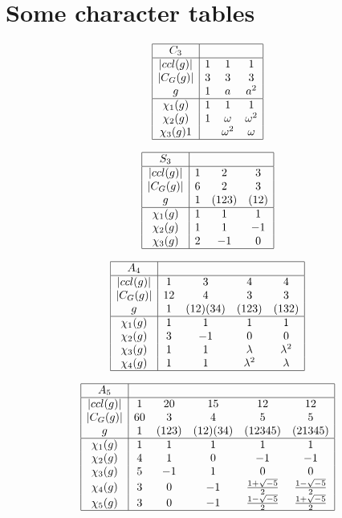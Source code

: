 {\section {Some character tables}

$$
\begin{array}{|c|ccc|}
\hline
C_3&&&\\
\hline
|ccl(g)|&1&1&1\\
|C_G(g)|&3&3&3\\
g&1&a&a^2\\
\hline
\chi_1(g)&1&1&1\\
\chi_2(g)&1&\omega&\omega^2\\
\chi_3(g)1&&\omega^2&\omega\\
\hline
\end{array}
$$

$$
\begin{array}{|c|ccc|}
\hline
S_3&&&\\
\hline
|ccl(g)|&1&2&3\\
|C_G(g)|&6&2&3\\
g&1&(123)&(12)\\
\hline
\chi_1(g)&1&1&1\\
\chi_2(g)&1&1&-1\\
\chi_3(g)&2&-1&0\\
\hline
\end{array}
$$

$$
\begin{array}{|c|cccc|}
\hline
A_4&&&&\\
\hline
|ccl(g)|&1&3&4&4\\
|C_G(g)|&12&4&3&3\\
g&1&(12)(34)&(123)&(132)\\
\hline
\chi_1(g)&1&1&1&1\\
\chi_2(g)&3&-1&0&0\\
\chi_3(g)&1&1&\lambda&\lambda^2 \\
\chi_4(g)&1&1&\lambda^2&\lambda \\
\hline
\end{array}
$$

$$
\begin{array}{|c|ccccc|}
\hline
A_5&&&&&\\
\hline
|ccl(g)|&1&20&15&12&12\\
|C_G(g)|&60&3&4&5&5\\
g&1&(123)&(12)(34)&(12345)&(21345)\\
\hline
\chi_1(g)&1&1&1&1&1\\
\chi_2(g)&4&1&0&-1&-1\\
\chi_3(g)&5&-1&1&0&0\\
\chi_4(g)&3&0&-1&{\frac {1 + \sqrt{-5}} {2}}&{\frac {1 - \sqrt{-5}} {2}}\\
\chi_5(g)&3&0&-1&{\frac {1 - \sqrt{-5}} {2}}&{\frac {1 + \sqrt{-5}} {2}}\\
\hline
\end{array}
$$

}
